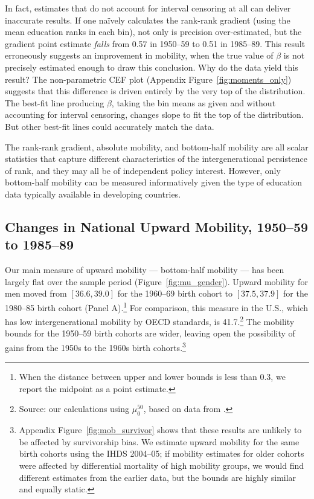 \documentclass[12pt,letterpaper]{article}
\numberwithin{equation}{section}
\begin{document}
In fact, estimates that do not account for interval censoring at all can deliver inaccurate results. If one na\"{i}vely calculates the rank-rank gradient (using the mean education ranks in each bin), not only is precision over-estimated, but the gradient point estimate \textit{falls} from 0.57 in 1950--59 to 0.51 in 1985--89. This result erroneously suggests an improvement in mobility, when the true value of $\beta$ is not precisely estimated enough to draw this conclusion. Why do the data yield this result? The non-parametric CEF plot (Appendix Figure~\ref{fig:moments_only}) suggests that this difference is driven entirely by the very top of the distribution. The best-fit line producing $\beta$, taking the bin means as given and without accounting for interval censoring, changes slope to fit the top of the distribution. But other best-fit lines could accurately match the data. 

The rank-rank gradient, absolute mobility, and bottom-half mobility are all scalar statistics that capture different characteristics of the intergenerational persistence of rank, and they may all be of independent policy interest. However, only bottom-half mobility can be measured informatively given the type of education data typically available in developing countries. 

\subsection{Changes in National Upward Mobility, 1950--59 to 1985--89}
\label{sec:national}

Our main measure of upward mobility --- bottom-half mobility --- has been largely flat over the sample period (Figure~\ref{fig:mu_gender}). Upward mobility for men moved from $[36.6, 39.0]$ for the 1960--69 birth cohort to $[37.5, 37.9]$ for the 1980--85 birth cohort (Panel A).\footnote{When the distance between upper and lower bounds is less than 0.3, we report the midpoint as a point estimate.} For comparison, this measure in the U.S., which has low intergenerational mobility by OECD standards, is 41.7.\footnote{Source: our calculations using $\mu_0^{50}$, based on data from .} The mobility bounds for the 1950--59 birth cohorts are wider, leaving open the possibility of gains from the 1950s to the 1960s birth cohorts.\footnote{Appendix Figure~\ref{fig:mob_survivor} shows that these results are unlikely to be affected by survivorship bias. We estimate upward mobility for the same birth cohorts using the IHDS 2004--05; if mobility estimates for older cohorts were affected by differential mortality of high mobility groups, we would find different estimates from the earlier data, but the bounds are highly similar and equally static.}
\end{document}
